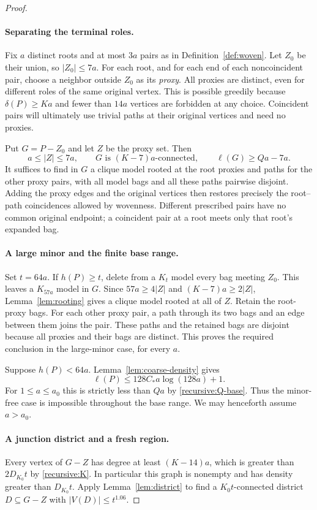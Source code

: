 \begin{proof}
\paragraph{Separating the terminal roles.}
Fix $a$ distinct roots and at most $3a$ pairs as in
Definition~\ref{def:woven}. Let $Z_0$ be their union, so $|Z_0|\le7a$.
For each root, and for each end of each noncoincident pair, choose a
neighbor outside $Z_0$ as its \emph{proxy}. All proxies are distinct,
even for different roles of the same original vertex. This is possible
greedily because $\delta(P)\ge Ka$ and fewer than $14a$ vertices are
forbidden at any choice. Coincident pairs will ultimately use trivial
paths at their original vertices and need no proxies.

Put $G=P-Z_0$ and let $Z$ be the proxy set. Then
\begin{equation}\label{recursive:proxy-bounds}
 a\le|Z|\le7a,\qquad
 G\text{ is }(K-7)a\text{-connected},\qquad
 \ell(G)\ge Qa-7a.
\end{equation}
It suffices to find in $G$ a clique model rooted at the root proxies and
paths for the other proxy pairs, with all model bags and all these paths
pairwise disjoint. Adding the proxy edges and the original vertices then
restores precisely the root--path coincidences allowed by wovenness.
Different prescribed pairs have no common original endpoint; a
coincident pair at a root meets only that root's expanded bag.

\paragraph{A large minor and the finite base range.}
Set $t=64a$. If $h(P)\ge t$, delete from a $K_t$ model every bag meeting
$Z_0$. This leaves a $K_{57a}$ model in $G$. Since
$57a\ge4|Z|$ and $(K-7)a\ge2|Z|$, Lemma~\ref{lem:rooting} gives a
clique model rooted at all of $Z$. Retain the root-proxy bags. For each
other proxy pair, a path through its two bags and an edge between them
joins the pair. These paths and the retained bags are disjoint because
all proxies and their bags are distinct. This proves the required
conclusion in the large-minor case, for every $a$.

Suppose $h(P)<64a$. Lemma~\ref{lem:coarse-density} gives
\[
 \ell(P)\le128C_*a\log(128a)+1.
\]
For $1\le a\le a_0$ this is strictly less than $Qa$ by
\eqref{recursive:Q-base}. Thus the minor-free case is impossible
throughout the base range. We may henceforth assume $a>a_0$.

\paragraph{A junction district and a fresh region.}
Every vertex of $G-Z$ has degree at least $(K-14)a$, which is greater
than $2D_{K_0}t$ by \eqref{recursive:K}. In particular this graph is
nonempty and has density greater than $D_{K_0}t$. Apply
Lemma~\ref{lem:district} to find a $K_0t$-connected district
$D\subseteq G-Z$ with $|V(D)|\le t^{1.06}$.


\end{proof}
